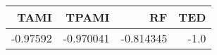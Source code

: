 \begin{tabular}{rrrr}
\toprule
    TAMI &     TPAMI &        RF &  TED \\
\midrule
-0.97592 & -0.970041 & -0.814345 & -1.0 \\
\bottomrule
\end{tabular}
